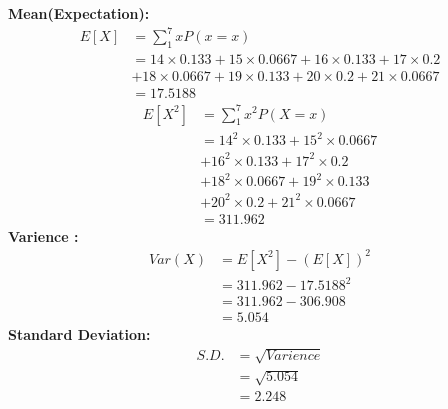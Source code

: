 \documentclass{article}
\begin{document}
\begin{multicols}{2}
\textbf{Mean(Expectation): }
\begin{align}
 E[X] &=\sum_1^7xP(x=x) \nonumber \\
      &=14\times0.133+15\times0.0667+16\times0.133+17\times0.2\nonumber\\
      & +18\times0.0667+19\times0.133+20\times0.2+21\times0.0667 \nonumber \\
      &=17.5188 \nonumber
\end{align}
\begin{align}
E[X^2]&=\sum_1^7x^2P(X=x) \nonumber \\
      &=14^2\times0.133+15^2\times0.0667\nonumber\\
      &+16^2\times0.133+17^2\times0.2\nonumber\\
      &+18^2\times0.0667+19^2\times0.133\nonumber\\
      &+20^2\times0.2+21^2\times0.0667 \nonumber \\
      &=311.962 \nonumber
\end{align}
\textbf{Varience :}
\begin{align}
Var(X) &=E[X^2]-(E[X])^2 \nonumber \\
       &=311.962-17.5188^2 \nonumber \\
       &=311.962-306.908   \nonumber \\
       &=5.054            \nonumber
\end{align}
\textbf{Standard Deviation: }
\begin{align}
S.D. &= \sqrt{Varience} \nonumber \\
     &=\sqrt{5.054}     \nonumber \\
     &=2.248            \nonumber 
\end{align}



\end{multicols}
\end{document}
